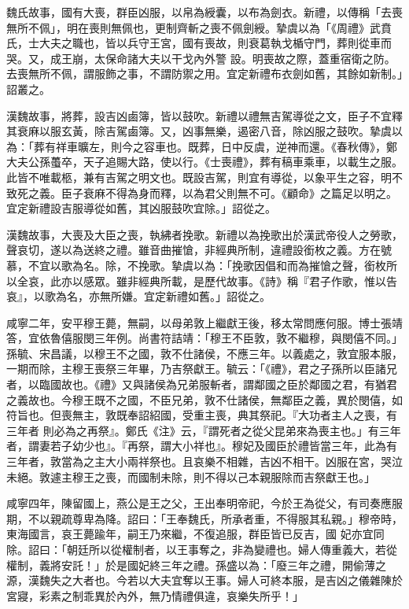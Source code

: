 \begin{pinyinscope}
 魏氏故事，國有大喪，群臣凶服，以帛為綬囊，以布為劍衣。新禮，以傳稱「去喪無所不佩」，明在喪則無佩也，更制齊斬之喪不佩劍綬。摯虞以為「《周禮》武賁氏，士大夫之職也，皆以兵守王宮，國有喪故，則衰葛執戈楯守門，葬則從車而哭。又，成王崩，太保命諸大夫以干戈內外警
 設。明喪故之際，蓋重宿衛之防。去喪無所不佩，謂服飾之事，不謂防禦之用。宜定新禮布衣劍如舊，其餘如新制。」詔叢之。



 漢魏故事，將葬，設吉凶鹵簿，皆以鼓吹。新禮以禮無吉駕導從之文，臣子不宜釋其衰麻以服玄黃，除吉駕鹵簿。又，凶事無樂，遏密八音，除凶服之鼓吹。摯虞以為：「葬有祥車曠左，則今之容車也。既葬，日中反虞，逆神而還。《春秋傳》，鄭大夫公孫蠆卒，天子追賜大路，使以行。《士喪禮》，葬有稿車乘車，以載生之服。此皆不唯載柩，兼有吉駕之明文也。既設吉駕，則宜有導從，以象平生之容，明不
 致死之義。臣子衰麻不得為身而釋，以為君父則無不可。《顧命》之篇足以明之。宜定新禮設吉服導從如舊，其凶服鼓吹宜除。」詔從之。



 漢魏故事，大喪及大臣之喪，執紼者挽歌。新禮以為挽歌出於漢武帝役人之勞歌，聲哀切，遂以為送終之禮。雖音曲摧愴，非經典所制，違禮設銜枚之義。方在號慕，不宜以歌為名。除，不挽歌。摯虞以為：「挽歌因倡和而為摧愴之聲，銜枚所以全哀，此亦以感眾。雖非經典所載，是歷代故事。《詩》稱『君子作歌，惟以告哀』，以歌為名，亦無所嫌。宜定新禮如舊。」詔從之。



 咸寧二年，安平穆王薨，無嗣，以母弟敦上繼獻王後，移太常問應何服。博士張靖答，宜依魯僖服閔三年例。尚書符詰靖：「穆王不臣敦，敦不繼穆，與閔僖不同。」孫毓、宋昌議，以穆王不之國，敦不仕諸侯，不應三年。以義處之，敦宜服本服，一期而除，主穆王喪祭三年畢，乃吉祭獻王。毓云：「《禮》，君之子孫所以臣諸兄者，以臨國故也。《禮》又與諸侯為兄弟服斬者，謂鄰國之臣於鄰國之君，有猶君之義故也。今穆王既不之國，不臣兄弟，敦不仕諸侯，無鄰臣之義，異於閔僖，如符旨也。但喪無主，敦既奉詔紹國，受重主喪，典其祭祀。『大功者主人之喪，有三年者
 則必為之再祭』。鄭氏《注》云，『謂死者之從父昆弟來為喪主也。」有三年者，謂妻若子幼少也』。『再祭，謂大小祥也』。穆妃及國臣於禮皆當三年，此為有三年者，敦當為之主大小兩祥祭也。且哀樂不相雜，吉凶不相干。凶服在宮，哭泣未絕。敦遽主穆王之喪，而國制未除，則不得以己本親服除而吉祭獻王也。」



 咸寧四年，陳留國上，燕公是王之父，王出奉明帝祀，今於王為從父，有司奏應服期，不以親疏尊卑為降。詔曰：「王奉魏氏，所承者重，不得服其私親。」穆帝時，東海國言，哀王薨踰年，嗣王乃來繼，不復追服，群臣皆已反吉，國
 妃亦宜同除。詔曰：「朝廷所以從權制者，以王事奪之，非為變禮也。婦人傳重義大，若從權制，義將安託！」於是國妃終三年之禮。孫盛以為：「廢三年之禮，開偷薄之源，漢魏失之大者也。今若以大夫宜奪以王事。婦人可終本服，是吉凶之儀雜陳於宮寢，彩素之制乖異於內外，無乃情禮俱違，哀樂失所乎！」




\end{pinyinscope}
